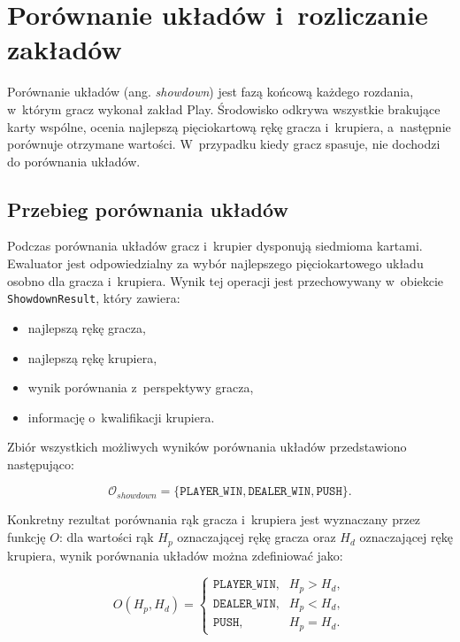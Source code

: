 \section{Porównanie układów i~rozliczanie zakładów}
\label{sec:showdown-i-rozliczenie}

Porównanie układów (ang. \emph{showdown}) jest fazą końcową każdego rozdania, w~którym gracz wykonał zakład Play.
Środowisko odkrywa wszystkie brakujące karty wspólne, ocenia najlepszą
pięciokartową rękę gracza i~krupiera, a~następnie porównuje otrzymane
wartości. W~przypadku kiedy gracz spasuje, nie dochodzi do porównania układów.

\subsection{Przebieg porównania układów}
\label{subsec:przebieg-showdownu}

Podczas porównania układów gracz i~krupier dysponują siedmioma kartami.
Ewaluator jest odpowiedzialny za wybór najlepszego pięciokartowego układu osobno dla gracza
i~krupiera. Wynik tej operacji jest przechowywany w~obiekcie
\texttt{ShowdownResult}, który zawiera:

\begin{itemize}
    \item najlepszą rękę gracza,
    \item najlepszą rękę krupiera,
    \item wynik porównania z~perspektywy gracza,
    \item informację o~kwalifikacji krupiera.
\end{itemize}

Zbiór wszystkich możliwych wyników porównania układów przedstawiono następująco:

\begin{equation}
    \mathcal{O}_{showdown}
    =
    \{
        \texttt{PLAYER\_WIN},
        \texttt{DEALER\_WIN},
        \texttt{PUSH}
    \}.
\end{equation}

Konkretny rezultat porównania rąk gracza i~krupiera jest wyznaczany przez funkcję \(O\):
dla wartości rąk \(H_p\) oznaczającej rękę gracza oraz \(H_d\) oznaczającej rękę krupiera, wynik porównania układów można zdefiniować jako:

\begin{equation}
    O(H_p,H_d)
    =
    \begin{cases}
        \texttt{PLAYER\_WIN}, & H_p > H_d, \\
        \texttt{DEALER\_WIN}, & H_p < H_d, \\
        \texttt{PUSH},        & H_p = H_d.
    \end{cases}
\end{equation}

